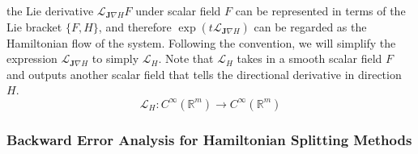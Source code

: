 \documentclass{article}
\begin{document}
      the Lie derivative $\mathcal{L}_{\mathbf{J} \nabla H} F$ under scalar field $F$ can be represented in terms of the Lie bracket $\{F, H\}$, and therefore $\exp(t \mathcal{L}_{\mathbf{J} \nabla H})$ can be regarded as the Hamiltonian flow of the system. Following the convention, we will simplify the expression $\mathcal{L}_{\mathbf{J} \nabla H}$ to simply $\mathcal{L}_H$. Note that $\mathcal{L}_H$ takes in a smooth scalar field $F$ and outputs another scalar field that tells the directional derivative in direction $H$. 
      \[\mathcal{L}_H: C^\infty (\mathbb{R}^m) \longrightarrow C^\infty (\mathbb{R}^m) \]

    \subsubsection{Backward Error Analysis for Hamiltonian Splitting Methods}
\end{document}
